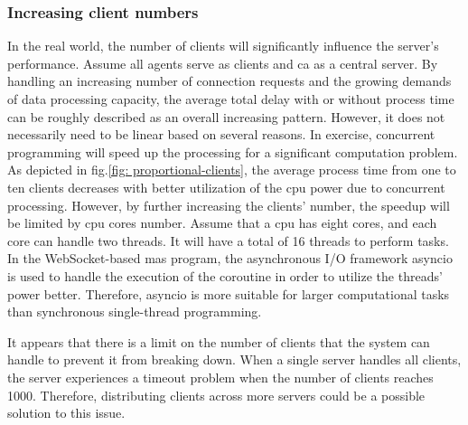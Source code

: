 \subsubsection{Increasing client numbers}
In the real world, the number of clients will significantly influence the server's 
performance. Assume all agents serve as clients and \gls{ca} as a central server. 
By handling an increasing number of connection requests and the growing demands of 
data processing capacity, the average total delay with or without process time can 
be roughly described as an overall increasing pattern. However, it does not necessarily 
need to be linear based on several reasons. In exercise, concurrent programming will 
speed up the processing for a significant computation problem. As depicted in 
fig.\ref{fig: proportional-clients}, the average process time from one to ten clients 
decreases with better utilization of the \gls{cpu} power due to concurrent processing. 
However, by further increasing the clients' number, the speedup will be limited 
by \gls{cpu} cores number. Assume that a \gls{cpu} has eight cores, and each core 
can handle two threads. It will have a total of 16 threads to perform tasks. In the 
WebSocket-based \gls{mas} program, the asynchronous I/O framework asyncio is used 
to handle the execution of the coroutine in order to utilize the threads' power 
better.
Therefore, asyncio is more suitable for larger computational tasks than synchronous 
single-thread programming.

It appears that there is a limit on the number of clients that the system can handle 
to prevent it from breaking down. When a single server handles all clients, the 
server experiences a timeout problem when the number of clients reaches 1000. 
Therefore, distributing clients across more servers could be a possible solution 
to this issue.


